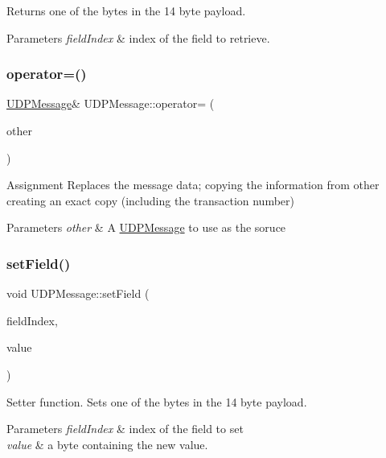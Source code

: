 Returns one of the bytes in the 14 byte payload. 
\begin{DoxyParams}{Parameters}
{\em field\+Index} & index of the field to retrieve. \\
\hline
\end{DoxyParams}
\mbox{\label{class_u_d_p_message_af3bb7f16fec948bcfbf99646b79c5c58}} 
\subsubsection{\texorpdfstring{operator=()}{operator=()}}
{\footnotesize\ttfamily \hyperlink{class_u_d_p_message}{U\+D\+P\+Message}\& U\+D\+P\+Message\+::operator= (\begin{DoxyParamCaption}\item[{const \hyperlink{class_u_d_p_message}{U\+D\+P\+Message} \&}]{other }\end{DoxyParamCaption})\hspace{0.3cm}{\ttfamily [inline]}}

Assignment Replaces the message data; copying the information from other creating an exact copy (including the transaction number) 
\begin{DoxyParams}{Parameters}
{\em other} & A \hyperlink{class_u_d_p_message}{U\+D\+P\+Message} to use as the soruce \\
\hline
\end{DoxyParams}
\mbox{\label{class_u_d_p_message_ad7f1c729cf357be18e6cda695f5e5d99}} 
\subsubsection{\texorpdfstring{set\+Field()}{setField()}}
{\footnotesize\ttfamily void U\+D\+P\+Message\+::set\+Field (\begin{DoxyParamCaption}\item[{unsigned char}]{field\+Index,  }\item[{unsigned char}]{value }\end{DoxyParamCaption})\hspace{0.3cm}{\ttfamily [inline]}}

Setter function. Sets one of the bytes in the 14 byte payload. 
\begin{DoxyParams}{Parameters}
{\em field\+Index} & index of the field to set \\
\hline
{\em value} & a byte containing the new value. \\
\hline
\end{DoxyParams}
\mbox{\label{class_u_d_p_message_a2fcacc64fbb5598848a391c9fd9aa8c2}} 
